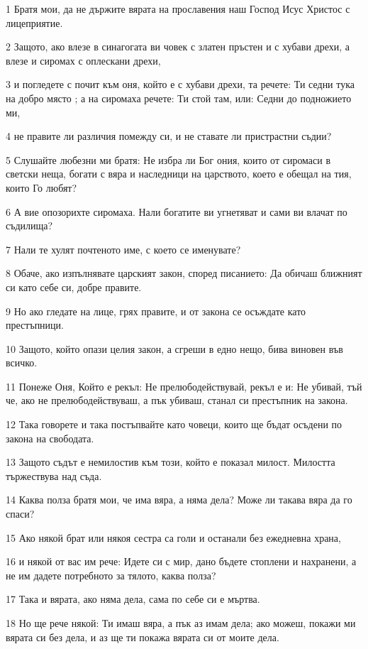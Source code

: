 \par 1 Братя мои, да не държите вярата на прославения наш Господ Исус Христос с лицеприятие.
\par 2 Защото, ако влезе в синагогата ви човек с златен пръстен и с хубави дрехи, а влезе и сиромах с оплескани дрехи,
\par 3 и погледете с почит към оня, който е с хубави дрехи, та речете: Ти седни тука на добро място ; а на сиромаха речете: Ти стой там, или: Седни до подножието ми,
\par 4 не правите ли различия помежду си, и не ставате ли пристрастни съдии?
\par 5 Слушайте любезни ми братя: Не избра ли Бог ония, които от сиромаси в светски неща, богати с вяра и наследници на царството, което е обещал на тия, които Го любят?
\par 6 А вие опозорихте сиромаха. Нали богатите ви угнетяват и сами ви влачат по съдилища?
\par 7 Нали те хулят почтеното име, с което се именувате?
\par 8 Обаче, ако изпълнявате царският закон, според писанието: Да обичаш ближният си като себе си, добре правите.
\par 9 Но ако гледате на лице, грях правите, и от закона се осъждате като престъпници.
\par 10 Защото, който опази целия закон, а сгреши в едно нещо, бива виновен във всичко.
\par 11 Понеже Оня, Който е рекъл: Не прелюбодействувай, рекъл е и: Не убивай, тъй че, ако не прелюбодействуваш, а пък убиваш, станал си престъпник на закона.
\par 12 Така говорете и така постъпвайте като човеци, които ще бъдат осъдени по закона на свободата.
\par 13 Защото съдът е немилостив към този, който е показал милост. Милостта тържествува над съда.
\par 14 Каква полза братя мои, че има вяра, а няма дела? Може ли такава вяра да го спаси?
\par 15 Ако някой брат или някоя сестра са голи и останали без ежедневна храна,
\par 16 и някой от вас им рече: Идете си с мир, дано бъдете стоплени и нахранени, а не им дадете потребното за тялото, каква полза?
\par 17 Така и вярата, ако няма дела, сама по себе си е мъртва.
\par 18 Но ще рече някой: Ти имаш вяра, а пък аз имам дела; ако можеш, покажи ми вярата си без дела, и аз ще ти покажа вярата си от моите дела.
